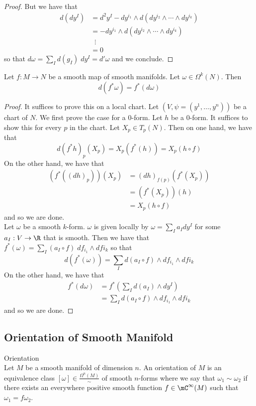 \documentclass[a4paper]{article}
\begin{document}
\begin{prp}{}{}
\begin{proof}
But we have that 
\begin{align*}
d(dy^I)&=d^2y^I-dy^{i_1}\wedge d(dy^{i_2}\wedge\cdots\wedge dy^{i_k})\\
&=-dy^{i_1}\wedge d(dy^{i_2}\wedge\cdots\wedge dy^{i_k})\\
&\;\;\vdots\\
&=0
\end{align*}
so that $d\omega=\sum_Id(g_I)\;dy^I=d'\omega$ and we conclude. 
\end{proof}
\end{prp}

\begin{prp}{}{} Let $f:M\to N$ be a smooth map of smooth manifolds. Let $\omega\in\Omega^k(N)$. Then $$d(f^\ast\omega)=f^\ast(d\omega)$$ 
\begin{proof}
It suffices to prove this on a local chart. Let $(V,\psi=(y^1,\dots,y^n))$ be a chart of $N$. We first prove the case for a $0$-form. Let $h$ be a $0$-form. It suffices to show this for every $p$ in the chart. Let $X_p\in T_p(N)$. Then on one hand, we have that $$d(f^\ast h)_p(X_p)=X_p(f^\ast(h))=X_p(h\circ f)$$ On the other hand, we have that 
\begin{align*}
(f^\ast((dh)_p))(X_p)&=(dh)_{f(p)}(f^\ast(X_p))\tag{Pull back of a one form}\\
&=(f^\ast(X_p))(h)\tag{Definition of the differntial}\\
&=X_p(h\circ f)\tag{Definition of $f^\ast$}
\end{align*} and so we are done. \\

Let $\omega$ be a smooth $k$-form. $\omega$ is given locally by $\omega=\sum_Ia_Idy^I$ for some $a_I:V\to\R$ that is smooth. Then we have that $f^\ast(\omega)=\sum_I(a_I\circ f)\;df_{i_1}\wedge df{i_k}$ so that $$d(f^\ast(\omega))=\sum_Id(a_I\circ f)\wedge df_{i_1}\wedge df{i_k}$$ On the other hand, we have that 
\begin{align*}
f^\ast(d\omega)&=f^\ast\left(\sum_Id(a_I)\wedge dy^I\right)\\
&=\sum_Id(a_I\circ f)\wedge df_{i_1}\wedge df{i_k}
\end{align*}
and so we are done. 
\end{proof}
\end{prp}

\subsection{Orientation of Smooth Manifold}
\begin{defn}{Orientation}{}\\
Let $M$ be a smooth manifold of dimension $n$. An orientation of $M$ is an equivalence class $[\omega]\in\frac{\Omega^n(M)}{\sim}$ of smooth $n$-forms where we say that $\omega_1\sim\omega_2$ if there exists an everywhere positive smooth function $f\in\mC^\infty(M)$ such that $\omega_1=f\omega_2$. 
\end{defn}
\end{document}
